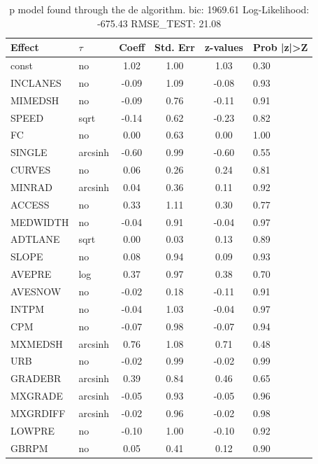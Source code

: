 \begin{table}
	\caption{p model found through the de algorithm. bic: 1969.61 Log-Likelihood: -675.43 RMSE_TEST: 21.08}
	\begin{center}
		\begin{tabular}{|l|l|c|c|c|l|}
			\hline
			Effect & $\tau$ & Coeff & Std. Err & z-values & Prob |z|>Z \\
			\hline
			const & no & 1.02 & 1.00 & 1.03 & 0.30 \\
			\hline
			INCLANES & no & -0.09 & 1.09 & -0.08 & 0.93 \\
			\hline
			MIMEDSH & no & -0.09 & 0.76 & -0.11 & 0.91 \\
			\hline
			SPEED & sqrt & -0.14 & 0.62 & -0.23 & 0.82 \\
			\hline
			FC & no & 0.00 & 0.63 & 0.00 & 1.00 \\
			\hline
			SINGLE & arcsinh & -0.60 & 0.99 & -0.60 & 0.55 \\
			\hline
			CURVES & no & 0.06 & 0.26 & 0.24 & 0.81 \\
			\hline
			MINRAD & arcsinh & 0.04 & 0.36 & 0.11 & 0.92 \\
			\hline
			ACCESS & no & 0.33 & 1.11 & 0.30 & 0.77 \\
			\hline
			MEDWIDTH & no & -0.04 & 0.91 & -0.04 & 0.97 \\
			\hline
			ADTLANE & sqrt & 0.00 & 0.03 & 0.13 & 0.89 \\
			\hline
			SLOPE & no & 0.08 & 0.94 & 0.09 & 0.93 \\
			\hline
			AVEPRE & log & 0.37 & 0.97 & 0.38 & 0.70 \\
			\hline
			AVESNOW & no & -0.02 & 0.18 & -0.11 & 0.91 \\
			\hline
			INTPM & no & -0.04 & 1.03 & -0.04 & 0.97 \\
			\hline
			CPM & no & -0.07 & 0.98 & -0.07 & 0.94 \\
			\hline
			MXMEDSH & arcsinh & 0.76 & 1.08 & 0.71 & 0.48 \\
			\hline
			URB & no & -0.02 & 0.99 & -0.02 & 0.99 \\
			\hline
			GRADEBR & arcsinh & 0.39 & 0.84 & 0.46 & 0.65 \\
			\hline
			MXGRADE & arcsinh & -0.05 & 0.93 & -0.05 & 0.96 \\
			\hline
			MXGRDIFF & arcsinh & -0.02 & 0.96 & -0.02 & 0.98 \\
			\hline
			LOWPRE & no & -0.10 & 1.00 & -0.10 & 0.92 \\
			\hline
			GBRPM & no & 0.05 & 0.41 & 0.12 & 0.90 \\

\end{tabular}
\end{center}
\end{table}

